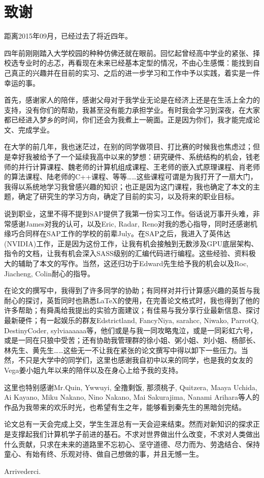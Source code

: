 \clearpage                              %
\section*{致谢}                         %
\par 距离2015年09月，已经过去了将近四年。
\par 四年前刚刚踏入大学校园的种种仿佛还就在眼前。回忆起曾经高中学业的紧张、择校选专业时的忐忑，再看现在未来已经基本定型的情况，不由心生感慨：能找到自己真正的兴趣并在目前的实习、之后的进一步学习和工作中予以实践，着实是一件幸运的事。
\par 首先，感谢家人的陪伴，感谢父母对于我学业无论是在经济上还是在生活上全力的支持，没有你们的帮助，我甚至没有能力承担学业。有时我会学习到深夜，在大家都已经进入梦乡的时间，你们还会为我煮上一碗面。正是因为你们，我才能完成论文、完成学业。
\par 在大学的前几年，我也迷茫过，在别的同学做项目、打比赛的时候我也焦虑过；但是幸好我被给予了一个延续我高中以来的梦想：研究硬件、系统结构的机会，钱老师的并行计算课程、魏老师的计算机组成课程、王老师的嵌入式原理课程、肖老师的算法课程、陆老师的C++课程、等等……这些课程可谓是为我打开了一扇大门，我得以系统地学习我曾感兴趣的知识；也正是因为这门课程，我也确定了本文的主题，确定了研究生的学习方向，确定了目前的实习，以及将来的职业目标。
\par 说到职业，这里不得不提到SAP提供了我第一份实习工作。俗话说万事开头难，非常感谢James对我的认可，以及Eric, Radar, Reno对我的悉心指导，同时还感谢机缘巧合同样在SAP工作的学校的前辈July。在SAP之后，我进入了英伟达(NVIDIA)工作，正是因为这份工作，让我有机会接触到无数涉及GPU底层架构、指令的文档，让我有机会深入SASS级别的汇编代码进行编程。这些经验、资料极大的辅助了本文的写作。当然，这还归功于Edward先生给予我的机会以及Roc, Jiacheng, Colin耐心的指导。
\par 在论文的撰写中，我得到了许多同学的协助；有同样对并行计算感兴趣的英哲与我耐心的探讨，英哲同时也熟悉\LaTeX 的使用，在完善论文格式时，我也得到了他的许多帮助；有舜禹给我提出的实验方面建议；有佳易与我分享行业最新信息、探讨最新硬件；有一起娱乐的群友Edstrictland, FancyNiya, sarahcc, Niwako, ParrotQ, DestinyCoder, sylviaaaaaa等，他们或是与我一同攻略鬼泣，或是一同彩虹六号，或是一同在只狼中受苦；还有协助我管理群的徐小姐、粥小姐、刘小姐、杨部长、林先生、黄先生……这些无一不让我在紧张的论文撰写中得以卸下一些压力。当然，不只是大学中的同学们，这里也感谢我自初中以来的同学，也是我的女友的Vega姜小姐九年以来的陪伴以及在身心上给予我的支持。
\par 这里也特别感谢Mr.Quin, Ywwuyi, 全撸剩饭, 那须桃子, Quitzera, Maaya Uchida, Ai Kayano, Miku Nakano, Nino Nakano, Mai Sakurajima, Nanami Arihara等人的作品为我带来的欢乐时光，也希望有生之年，能够看到秦先生的黑暗剑完结。
\par 论文总有一天会完成上交，学生生涯总有一天会迎来结束。然而对新知识的探求正是支撑起我们计算机学子前进的基石。不求对世界做出什么改变，不求对人类做出什么贡献，只求在未来的道路里不忘初心、坚守道德、尽力而为、劳逸结合、保持童心、有始有终、乐观对待、做自己想做的事，并且无憾一生。
\par Arrivederci.
